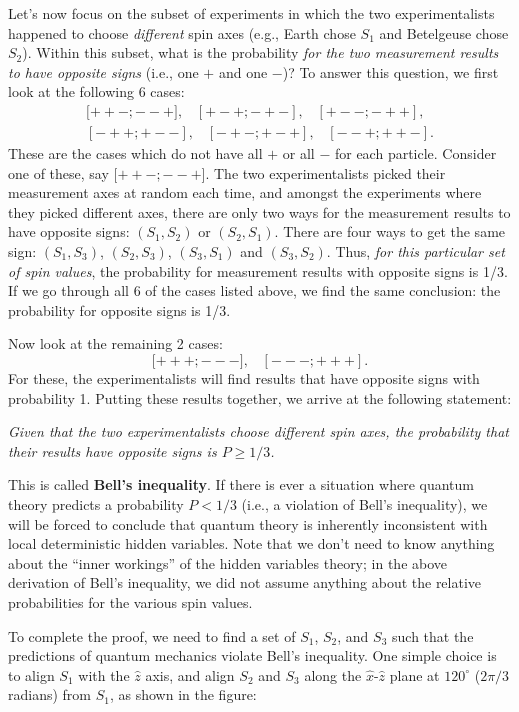\documentclass[pra,11pt]{revtex4}
\begin{document}
Let's now focus on the subset of experiments in which the two
experimentalists happened to choose \textit{different} spin axes
(e.g., Earth chose $S_1$ and Betelgeuse chose $S_2$).  Within this
subset, what is the probability \textit{for the two measurement
  results to have opposite signs} (i.e., one $+$ and one $-$)?  To
answer this question, we first look at the following 6 cases:
$$\begin{aligned}{[}{++-};{--+}], \;\;\; [{+-+};{-+-}], \;\;\; [{+--};{-++}],\\ [{-++};{+--}], \;\;\; [{-+-};{+-+}], \;\;\; [{--+};{++-}].\end{aligned}$$
These are the cases which do not have all $+$ or all $-$ for each
particle.  Consider one of these, say ${[}{++-};{--+}]$.  The two
experimentalists picked their measurement axes at random each time,
and amongst the experiments where they picked different axes, there
are only two ways for the measurement results to have opposite signs:
$(S_1,S_2)$ or $(S_2,S_1)$.  There are four ways to get the same sign:
$(S_1,S_3)$, $(S_2,S_3)$, $(S_3,S_1)$ and $(S_3, S_2)$.  Thus,
\textit{for this particular set of spin values}, the probability for
measurement results with opposite signs is 1/3.  If we go through all
6 of the cases listed above, we find the same conclusion: the
probability for opposite signs is 1/3.

Now look at the remaining 2 cases:
$${[}{+++};{---}], \;\;\; [{---};{+++}].$$
For these, the experimentalists will find results that have opposite
signs with probability 1.  Putting these results together, we arrive
at the following statement:

\textit{Given that the two experimentalists choose different spin
  axes, the probability that their results have opposite signs is $P
  \ge 1/3$.}

This is called \textbf{Bell's inequality}.  If there is ever a
situation where quantum theory predicts a probability $P < 1/3$ (i.e.,
a violation of Bell's inequality), we will be forced to conclude that
quantum theory is inherently inconsistent with local deterministic
hidden variables.  Note that we don't need to know anything about the
``inner workings'' of the hidden variables theory; in the above
derivation of Bell's inequality, we did not assume anything about the
relative probabilities for the various spin values.

To complete the proof, we need to find a set of $S_1$, $S_2$, and
$S_3$ such that the predictions of quantum mechanics violate Bell's
inequality.  One simple choice is to align $S_1$ with the $\hat{z}$
axis, and align $S_2$ and $S_3$ along the $\hat{x}$-$\hat{z}$ plane at
$120^\circ$ ($2\pi/3$ radians) from $S_1$, as shown in the figure:
\end{document}
